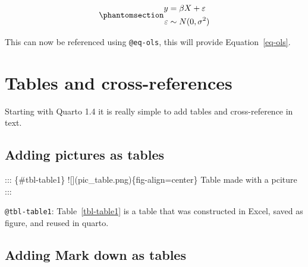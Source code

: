 \documentclass[
  11pts,
]{article}
\newenvironment{Shaded}{\begin{snugshade}}{\end{snugshade}}
\newcommand{\NormalTok}[1]{\textcolor[rgb]{0.00,0.23,0.31}{#1}}
\begin{document}
\begin{equation}\phantomsection\label{eq-ols}{
\begin{aligned}
y &= \beta X + \varepsilon \\
\varepsilon &\sim N(0,\sigma^2)
\end{aligned}
}\end{equation}

This can now be referenced using \texttt{@eq-ols}, this will provide
Equation~\ref{eq-ols}.

\section{Tables and cross-references}\label{tables-and-cross-references}

Starting with Quarto 1.4 it is really simple to add tables and
cross-reference in text.

\subsection{Adding pictures as tables}\label{adding-pictures-as-tables}

\begin{table}

\caption{\label{tbl-table1}}


\end{table}%

\begin{Shaded}
\begin{Highlighting}[]
\NormalTok{::: \{\#tbl{-}table1\}}
\NormalTok{![](pic\_table.png)\{fig{-}align=center\}}
\NormalTok{Table made with a pciture}
\NormalTok{:::}
\end{Highlighting}
\end{Shaded}

\texttt{@tbl-table1}: Table~\ref{tbl-table1} is a table that was
constructed in Excel, saved as figure, and reused in quarto.

\subsection{Adding Mark down as
tables}\label{adding-mark-down-as-tables}
\end{document}
